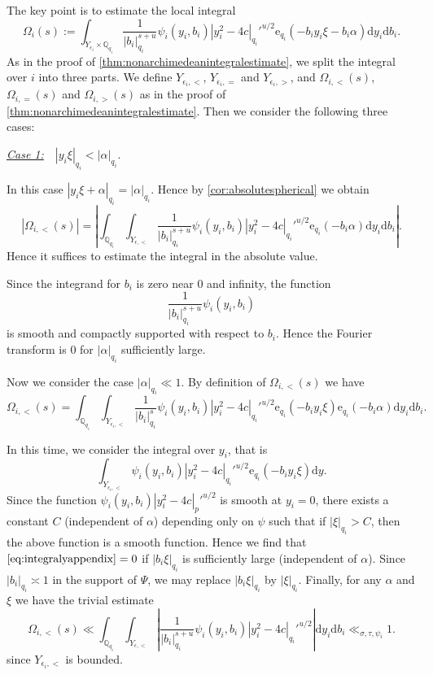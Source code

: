 \documentclass[10pt,oneside,reqno]{amsart}
\makeatletter
\newcommand\rmd{\mathrm{d}}
\newcommand\rme{\mathrm{e}}
\newcommand\QQ{\mathbb{Q}}
\theoremstyle{THEOREM}
\theoremstyle{DEFINITION}
\theoremstyle{EXERCISE}
\numberwithin{equation}{section}
\renewenvironment{proof}[1][\proofname]{\par
  \vspace{-6pt}
  \pushQED{\qed}
  \normalfont \topsep6\p@\@plus6\p@\relax
  \trivlist
  \item[\hskip\labelsep\rmfamily\bfseries
    #1\@addpunct{:}]\ignorespaces
}{
  \popQED\endtrivlist\@endpefalse
  \vspace{-6pt}
}
\newenvironment{insertproof}[1][\proofname]{\renewcommand\qedsymbol{$\blacksquare$}
  \par
  \vspace{-6pt}
  \pushQED{\qed}
  \normalfont \topsep6\p@\@plus6\p@\relax
  \trivlist
  \item[\hskip\labelsep\rmfamily\bfseries
    #1\@addpunct{:}]\ignorespaces
}{
  \popQED\endtrivlist\@endpefalse
  \vspace{-6pt}
}
\makeatother
\begin{document}
\begin{proof}
\begin{insertproof}
The key point is to estimate the local integral
\[
\Omega_i(s):=\int_{Y_{\epsilon_i}\times \QQ_{q_i}}\frac{1}{|b_i|_{q_i}^{s+u}} \psi_{i}(y_i,b_i)|y_i^2-4c|_{q_i}'^{u/2}\rme_{q_i}(-b_iy_i\xi-b_i\alpha)\rmd y_i\rmd b_i.
\]
As in the proof of \autoref{thm:nonarchimedeanintegralestimate}, we split the integral over $i$ into three parts. We define $Y_{\epsilon_i,<}$, $Y_{\epsilon_i,=}$ and $Y_{\epsilon_i,>}$, and $\Omega_{i,<}(s)$, $\Omega_{i,=}(s)$ and $\Omega_{i,>}(s)$ as in the proof of \autoref{thm:nonarchimedeanintegralestimate}. Then we consider the following three cases:

\underline{\emph{Case 1:}}\ \ $|y_i\xi|_{q_i}<|\alpha|_{q_i}$.

In this case $|y_i\xi+\alpha|_{q_i}=|\alpha|_{q_i}$. Hence by \autoref{cor:absolutespherical} we obtain
\[
|\Omega_{i,<}(s)|=\left|\int_{\QQ_{q_i}}\int_{Y_{\epsilon,<}} \frac{1}{|b_i|_{q_i}^{s+u}}\psi_{i}(y_i,b_i)|y_i^2-4c|_{q_i}'^{u/2}\rme_{q_i}(-b_i\alpha)\rmd y_i\rmd b_i\right|.
\]
Hence it suffices to estimate the integral in the absolute value.

Since the integrand for $b_i$ is zero near $0$ and infinity, the function
\[
\frac{1}{|b_i|_{q_i}^{s+u}}\psi_i(y_i,b_i)
\]
is smooth and compactly supported with respect to $b_i$. Hence the Fourier transform is $0$ for $|\alpha|_{q_i}$ sufficiently large.

Now we consider the case $|\alpha|_{q_i}\ll 1$. By definition of $\Omega_{i,<}(s)$ we have
\[
\Omega_{i,<}(s)=\int_{\QQ_{q_i}}\int_{Y_{\epsilon_i,<}}\frac{1}{|b_i|_{q_i}^{s}} \psi_i(y_i,b_i)|y_i^2-4c|_{q_i}'^{u/2}\rme_{q_i}(-b_iy_i\xi)\rme_{q_i}(-b_i\alpha)\rmd y_i\rmd b_i. 
\]

In this time, we consider the integral over $y_i$, that is
\begin{equation}\label{eq:integralyappendix}
\int_{Y_{\epsilon_i,<}}\psi_i(y_i,b_i)|y_i^2-4c|_{q_i}'^{u/2}\rme_{q_i}(-b_iy_i\xi)\rmd y.
\end{equation}
Since the function $\psi_i(y_i,b_i)|y_i^2-4c|_p'^{u/2}$
is smooth at $y_i=0$, there exists a constant $C$ (independent of $\alpha$) depending only on $\psi$ such that if $|\xi|_{q_i}>C$, then the above function is a smooth function. Hence we find that $\eqref{eq:integralyappendix}=0$ if $|b_i\xi|_{q_i}$ is sufficiently large (independent of $\alpha$). Since $|b_i|_{q_i}\asymp 1$ in the support of $\Psi$, we may replace $|b_i\xi|_{q_i}$ by $|\xi|_{q_i}$. Finally, for any $\alpha$ and $\xi$ we have the trivial estimate
\[
\Omega_{i,<}(s)\ll\int_{\QQ_{q_i}}\int_{Y_{\epsilon,<}}\left|\frac{1}{|b_i|_{q_i}^{s+u}}\psi_i(y_i,b_i) |y_i^2-4c|_{q_i}'^{u/2}\right|\rmd y_i\rmd b_i\ll_{\sigma,\tau,\psi_i} 1.
\]
since $Y_{\epsilon_i,<}$ is bounded.


\end{insertproof}
\end{proof}
\end{document}
